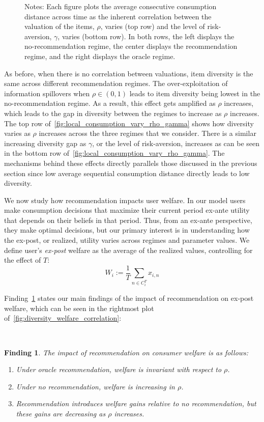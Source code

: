 \documentclass[manuscript, nonacm]{acmart}
\newtheorem{finding}{Finding}
\begin{document}
\begin{figure}[t]
\begin{subfigure}{.3\linewidth}
\end{subfigure}%
\caption*{\scriptsize Notes: Each figure plots the average consecutive consumption distance across time as the inherent correlation between the valuation of the items, $\rho$, varies (top row) and the level of risk-aversion, $\gamma$, varies (bottom row). In both rows, the left displays the no-recommendation regime, the center displays the recommendation regime, and the right displays the oracle regime.}
\label{fig:local_consumption_vary_rho_gamma}
\end{figure}
\addtocounter{figure}{-1}

As before, when there is no correlation between valuations, item diversity is the same across different recommendation regimes. The over-exploitation of information spillovers when $\rho \in (0,1)$ leads to item diversity being lowest in the no-recommendation regime. As a result, this effect gets amplified as $\rho$ increases, which leads to the gap in diversity between the regimes to increase as $\rho$ increases. The top row of~\autoref{fig:local_consumption_vary_rho_gamma} shows how diversity varies as $\rho$ increases across the three regimes that we consider. There is a similar increasing diversity gap as $\gamma$, or the level of risk-aversion, increases as can be seen in the bottom row of~\autoref{fig:local_consumption_vary_rho_gamma}. The mechanisms behind these effects directly parallels those discussed in the previous section since low average sequential consumption distance directly leads to low diversity.
\par 

We now study how recommendation impacts user welfare. In our model users make consumption decisions that maximize their current period ex-ante utility that depends on their beliefs in that period. Thus, from an ex-ante perspective, they make optimal decisions, but our primary interest is in understanding how the ex-post, or realized, utility varies across regimes and parameter values. We define user's \textit{ex-post} welfare as the average of the realized values, controlling for the effect of $T$:
$$W_i:= \frac{1}{T}\sum_{n \in C_i^T} x_{i,n}$$

\noindent Finding~\ref{finding_welfare_gap} states our main findings of the impact of recommendation on ex-post welfare, which can be seen in the rightmost plot of~\autoref{fig:diversity_welfare_correlation}:

~\par
\begin{finding}\label{finding_welfare_gap}
The impact of recommendation on consumer welfare is as follows:
\begin{enumerate}
\item Under oracle recommendation, welfare is invariant with respect to $\rho$.
\item Under no recommendation, welfare is increasing in $\rho$.
\item Recommendation introduces welfare gains relative to no recommendation, but these gains are decreasing as $\rho$ increases.
\end{enumerate}
\end{finding}
\par 
\end{document}
